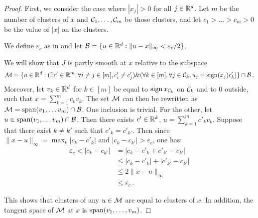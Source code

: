 \begin{proof}

  First, we consider the case where $| x_j| >0$ for all $j\in\mathbb{R}^d$.
  Let $m$ be the number of clusters of $x$ and $\mathcal{C}_1, \ldots, \mathcal{C}_m$ be those clusters, and let $c_1 > \ldots > c_m > 0$ be the  value of  $\lvert x \rvert$ on the clusters.

  We define $\varepsilon_c$ as in  and 
  let $\mathcal{B} = \{u \in \mathbb{R}^d: \lVert u - x \rVert_\infty < \varepsilon_c / 2\}$.
  
  We will show that $J$ is partly smooth at $x$ relative to the subspace
  \begin{equation}
    \mathcal{M} = \{ u \in \mathbb{R}^d : (\exists c' \in \mathbb{R}^m, \forall i \neq j \in [m], c'_i \neq c'_j) \& (\forall k \in [m], \forall j \in \mathcal{C}_k, u_j = \operatorname{sign}(x_j) c'_k) \} \cap \mathcal{B} \, .
  \end{equation}
  Moreover, let $v_k \in \mathbb{R}^d$ for $k \in [m]$  be equal to $\operatorname{sign} x_{\mathcal{C}_k}$ on $\mathcal{C}_k$ and to 0 outside, such that $x = \sum_{k=1}^m c_k v_k$.
  The set $\mathcal{M}$ can then be rewritten as $\mathcal{M} = \operatorname{span}(v_1, \ldots v_m) \cap \mathcal{B}$.
  One inclusion is trivial.
  For the other, let $u \in \operatorname{span}(v_1, \ldots v_m) \cap \mathcal{B}$.
  Then there exists $c' \in \mathbb{R}^k$, $u = \sum_{k=1}^m c'_k v_k$.
  Suppose that there exist $k \neq k'$ such that $c'_k = c'_{k'}$.
  Then since $\lVert x - u \rVert_\infty = \max_k |c_k - c'_k|$ and $|c_k - c_{k'}| > \varepsilon_c$, one has:
  \begin{align*}
     \varepsilon_c < |c_k - c_{k'}|
     &= |c_k - c'_k + c'_{k'} - c_{k'}| \\
     &\leq |c_k - c'_k| + |c'_{k'} - c_{k'}| \\
     &\leq 2 \lVert x - u \rVert_\infty \\
     &\leq  \varepsilon_c \, .
  \end{align*}

  This shows that clusters of any $u \in \mathcal{M}$ are equal to clusters of $x$.
  In addition, the tangent space of $\mathcal{M}$ at $x$ is $\operatorname{span}(v_1, \hdots, v_m)$. 
  
  

  


\end{proof}
